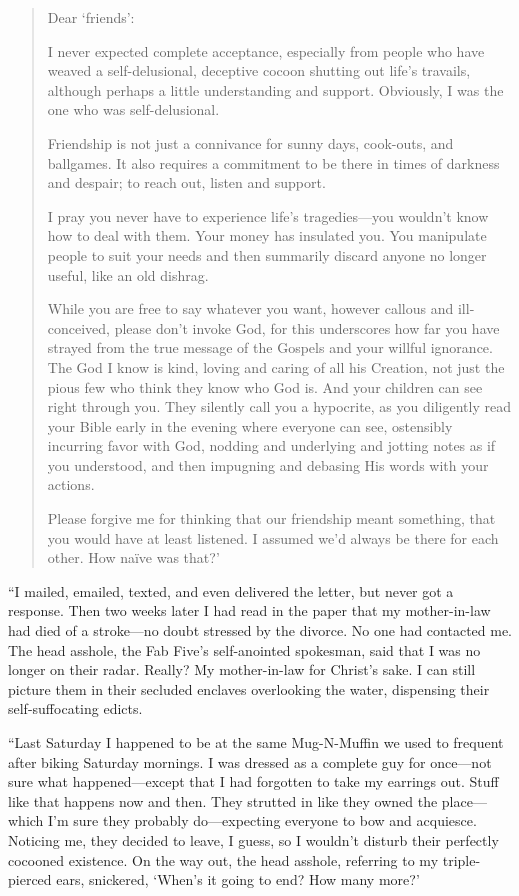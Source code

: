 \begin{quote}
Dear `friends':

I never expected complete acceptance, especially from people who have
weaved a self-delusional, deceptive cocoon shutting out life's travails,
although perhaps a little understanding and support. Obviously, I was
the one who was self-delusional.

Friendship is not just a connivance for sunny days, cook-outs, and
ballgames. It also requires a commitment to be there in times of
darkness and despair; to reach out, listen and support.

I pray you never have to experience life's tragedies---you wouldn't know
how to deal with them. Your money has insulated you. You manipulate
people to suit your needs and then summarily discard anyone no longer
useful, like an old dishrag.

While you are free to say whatever you want, however callous and
ill-conceived, please don't invoke God, for this underscores how far you
have strayed from the true message of the Gospels and your willful
ignorance. The God I know is kind, loving and caring of all his
Creation, not just the pious few who think they know who God is. And
your children can see right through you. They silently call you a
hypocrite, as you diligently read your Bible early in the evening where
everyone can see, ostensibly incurring favor with God, nodding and
underlying and jotting notes as if you understood, and then impugning
and debasing His words with your actions.

Please forgive me for thinking that our friendship meant something, that
you would have at least listened. I assumed we'd always be there for
each other. How naïve was that?'
\end{quote}

\noindent ``I mailed, emailed, texted, and even delivered the letter,
but never got a response. Then two weeks later I had read in the paper
that my mother-in-law had died of a stroke---no doubt stressed by the
divorce. No one had contacted me. The head asshole, the Fab Five's
self-anointed spokesman, said that I was no longer on their radar.
Really? My mother-in-law for Christ's sake. I can still picture them in
their secluded enclaves overlooking the water, dispensing their
self-suffocating edicts.

``Last Saturday I happened to be at the same Mug-N-Muffin we used to
frequent after biking Saturday mornings. I was dressed as a complete guy
for once---not sure what happened---except that I had forgotten to take
my earrings out. Stuff like that happens now and then. They strutted in
like they owned the place---which I'm sure they probably do---expecting
everyone to bow and acquiesce. Noticing me, they decided to leave, I
guess, so I wouldn't disturb their perfectly cocooned existence. On the
way out, the head asshole, referring to my triple-pierced ears,
snickered, `When's it going to end? How many more?'

